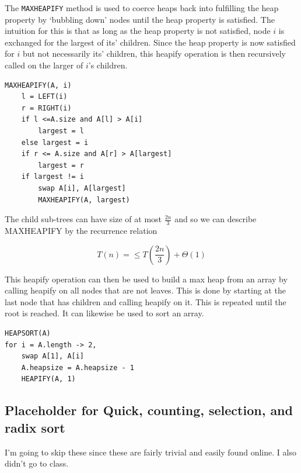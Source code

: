 \documentclass[../notes.tex]{subfiles}
\begin{document}
The \texttt{MAXHEAPIFY} method is used to coerce heaps back into fulfilling the heap property by `bubbling down' nodes until the heap property is satisfied.
The intuition for this is that as long as the heap property is not satisfied, node $ i $ is exchanged for the largest of its' children. Since the heap property is now satisfied for $ i $ but not necessarily its' children, this heapify operation is then recursively called on the larger of $ i $'s children.

\begin{listing}[H]
\begin{verbatim}
MAXHEAPIFY(A, i)
	l = LEFT(i)
	r = RIGHT(i)
	if l <=A.size and A[l] > A[i]
		largest = l
	else largest = i
	if r <= A.size and A[r] > A[largest]
		largest = r
	if largest != i
		swap A[i], A[largest]
		MAXHEAPIFY(A, largest)
\end{verbatim}
\end{listing}


The child sub-trees can have size of at most $ \frac{2n}{3} $ and so we can describe MAXHEAPIFY by the recurrence relation

\begin{equation}
	T(n) = \le  T(\frac{2n}{3}) + \Theta(1)
\end{equation}





This heapify operation can then be used to build a max heap from an array by calling heapify on all nodes that are not leaves. This is done by starting at the last node that has children and calling heapify on it. This is repeated until the root is reached. It can likewise be used to sort an array.



\begin{listing}[H]
\begin{verbatim}
HEAPSORT(A)
for i = A.length -> 2,
	swap A[1], A[i]
	A.heapsize = A.heapsize - 1
	HEAPIFY(A, 1)
\end{verbatim}
\end{listing}



\subsection{Placeholder for Quick, counting, selection, and radix sort}

I'm going to skip these since these are fairly trivial and easily found online. I also didn't go to class.
\end{document}
